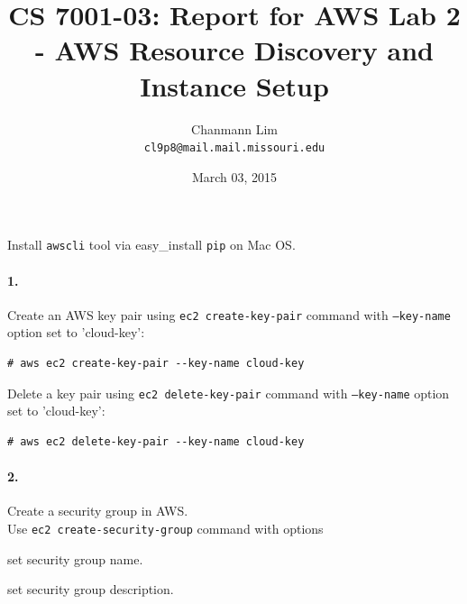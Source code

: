 \documentclass[a4paper]{article}
\begin{document}
\title{CS 7001-03: Report for AWS Lab 2 - AWS Resource Discovery and Instance Setup}
\author{Chanmann Lim\\ 
	\texttt{cl9p8@mail.mail.missouri.edu}}
\date{March 03, 2015}
\maketitle


Install \texttt{awscli} tool via easy\_install \texttt{pip} on Mac OS.

\paragraph{1. } Create an AWS key pair using \texttt{ec2 create-key-pair} command with \texttt{--key-name} option set to 'cloud-key':
\begin{verbatim}
# aws ec2 create-key-pair --key-name cloud-key
\end{verbatim}

Delete a key pair using \texttt{ec2 delete-key-pair} command with \texttt{--key-name} option set to 'cloud-key':
\begin{verbatim}
# aws ec2 delete-key-pair --key-name cloud-key
\end{verbatim}

\paragraph{2. } Create a security group in AWS. \\

Use \texttt{ec2 create-security-group} command with options
\begin{description}
\leftskip 0.4in
\parindent -0.4in
	\item[\texttt{--group-name} : ] set security group name.
	\item[\texttt{--description} : ] set security group description.
\end{description}
\end{document}
